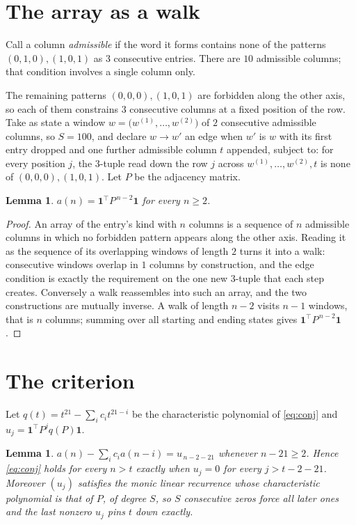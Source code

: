 \documentclass[11pt,a4paper]{article}
\theoremstyle{plain}
\newtheorem{lemma}[theorem]{Lemma}
\theoremstyle{definition}
\begin{document}
\section{The array as a walk}

Call a column \emph{admissible} if the word it forms contains none of the patterns
$(0,1,0), (1,0,1)$ as $3$ consecutive entries. There are $10$ admissible columns; that condition
involves a single column only.

The remaining patterns $(0,0,0), (1,0,1)$ are forbidden along the other axis, so each of them
constrains $3$ consecutive columns at a fixed position of the row. Take as state a
window $w=\bigl(w^{(1)},\dots,w^{(2)}\bigr)$ of $2$ consecutive admissible
columns, so $S=100$, and declare $w\to w'$ an edge when $w'$ is $w$ with its first entry
dropped and one further admissible column $t$ appended, subject to: for every position
$j$, the $3$-tuple read down the row $j$ across $w^{(1)},\dots,w^{(2)},t$
is none of $(0,0,0), (1,0,1)$. Let $P$ be the adjacency matrix.

\begin{lemma}\label{lem:walk}
$a(n)=\mathbf{1}^{\!\top}P^{\,n-2}\mathbf{1}$ for every $n\ge2$.
\end{lemma}

\begin{proof}
An array of the entry's kind with $n$ columns is a sequence of $n$ admissible columns in
which no forbidden pattern appears along the other axis. Reading it as the sequence of its
overlapping windows of length $2$ turns it into a walk: consecutive windows overlap in
$1$ columns by construction, and the edge condition is exactly the requirement on the one
new $3$-tuple that each step creates. Conversely a walk reassembles into such an array,
and the two constructions are mutually inverse. A walk of length $n-2$ visits $n-1$
windows, that is $n$ columns; summing over all starting and ending states gives
$\mathbf{1}^{\!\top}P^{\,n-2}\mathbf{1}$.
\end{proof}

\section{The criterion}

Let $q(t)=t^{21}-\sum_i c_i t^{21-i}$ be the characteristic polynomial of
\eqref{eq:conj} and $u_j=\mathbf{1}^{\!\top}P^{j}q(P)\mathbf{1}$.

\begin{lemma}\label{lem:crit}
$a(n)-\sum_i c_i a(n-i)=u_{\,n-2-21}$ whenever $n-21\ge2$. Hence
\eqref{eq:conj} holds for every $n>t$ exactly when $u_j=0$ for every
$j>t-2-21$. Moreover $(u_j)$ satisfies the monic linear recurrence whose
characteristic polynomial is that of $P$, of degree $S$, so $S$ consecutive zeros force all
later ones and the last nonzero $u_j$ pins $t$ down exactly.
\end{lemma}
\end{document}
